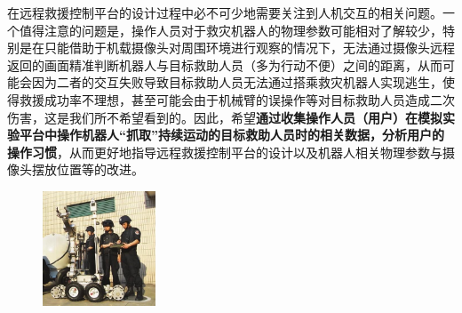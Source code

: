 \documentclass[12pt]{article}  %
\begin{document}
	在远程救援控制平台的设计过程中必不可少地需要关注到人机交互的相关问题。一个值得注意的问题是，操作人员对于救灾机器人的物理参数可能相对了解较少，特别是在只能借助于机载摄像头对周围环境进行观察的情况下，无法通过摄像头远程返回的画面精准判断机器人与目标救助人员（多为行动不便）之间的距离，从而可能会因为二者的交互失败导致目标救助人员无法通过搭乘救灾机器人实现逃生，使得救援成功率不理想，甚至可能会由于机械臂的误操作等对目标救助人员造成二次伤害，这是我们所不希望看到的。因此，希望\textbf{通过收集操作人员（用户）在模拟实验平台中操作机器人“抓取”持续运动的目标救助人员时的相关数据，分析用户的操作习惯}，从而更好地指导远程救援控制平台的设计以及机器人相关物理参数与摄像头摆放位置等的改进。
	\begin{figure}[H]
		\centering
		\includegraphics[width=0.3\textwidth]{1.png}
	\end{figure}
	
\end{document}
